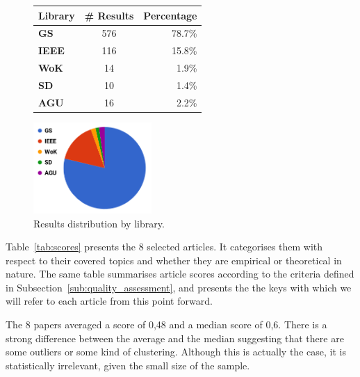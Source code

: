 \begin{figure}[htb]
    \centering
    \begin{tabular}[b]{lcr}
        \toprule
        \textbf{Library}&\textbf{\# Results}&\textbf{Percentage}\\
        \midrule
        \textbf{GS}&576&78.7\%\\
        \midrule
        \textbf{IEEE}&116&15.8\%\\
        \midrule
        \textbf{WoK}&14&1.9\%\\
        \midrule
        \textbf{SD}&10&1.4\%\\
        \midrule
        \textbf{AGU}&16&2.2\%\\
        \bottomrule
    \end{tabular}
    \qquad
    \includegraphics[width=0.4\textwidth]{img/new_results_distribution.png}
    \caption{Results distribution by
    library.}\label{fig:results_distribution}
\end{figure}

Table~\ref{tab:scores} presents the 8 selected articles. It categorises
them with respect to their covered topics and whether they are empirical
or theoretical in nature. The same table summarises article scores
according to the criteria defined in
Subsection~\ref{sub:quality_assessment}, and presents the the keys with
which we will refer to each article from this point forward.

The 8 papers averaged a score of 0,48 and a median score of 0,6. There
is a strong difference between the average and the median suggesting
that there are some outliers or some kind of clustering. Although this
is actually the case, it is statistically irrelevant, given the small
size of the sample.

